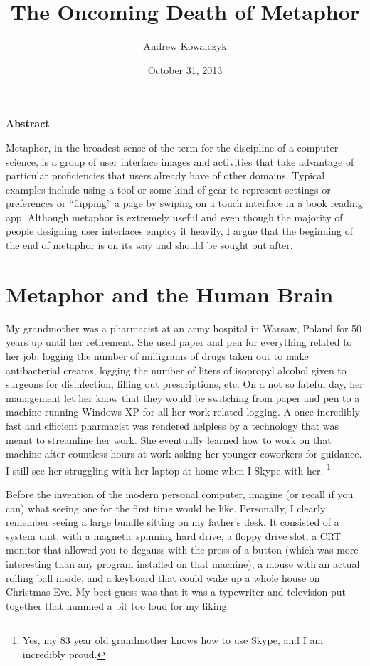 \documentclass[11pt, oneside]{article}
\title{The Oncoming Death of Metaphor}
\author{Andrew Kowalczyk}
\date{October 31, 2013}
\begin{document}
\maketitle
\centerline{\textbf{Abstract}}
Metaphor, in the broadest sense of the term for the discipline of a computer science, is a group of user interface images and activities that take advantage of particular proficiencies that users already have of other domains. Typical examples include using a tool or some kind of gear to represent settings or preferences or ``flipping'' a page by swiping on a touch interface in a book reading app. Although metaphor is extremely useful and even though the majority of people designing user interfaces employ it heavily, I argue that the beginning of the end of metaphor is on its way and should be sought out after.

\pagebreak
\section{Metaphor and the Human Brain} 
My grandmother was a pharmacist at an army hospital in Warsaw, Poland for 50 years up until her retirement. She used paper and pen for everything related to her job: logging the number of milligrams of drugs taken out to make antibacterial creams, logging the number of liters of isopropyl alcohol given to surgeons for disinfection, filling out prescriptions, etc. On a not so fateful day, her management let her know that they would be switching from paper and pen to a machine running Windows XP for all her work related logging. A once incredibly fast and efficient pharmacist was rendered helpless by a technology that was meant to streamline her work. She eventually learned how to work on that machine after countless hours at work asking her younger coworkers for guidance. I still see her struggling with her laptop at home when I Skype with her. \footnote{Yes, my 83 year old grandmother knows how to use Skype, and I am incredibly proud.}

Before the invention of the modern personal computer, imagine (or recall if you can) what seeing one for the first time would be like.
Personally, I clearly remember seeing a large bundle sitting on my father's desk. It consisted of a system unit, with a magnetic spinning hard drive, a floppy drive slot, a CRT monitor that allowed you to degauss with the press of a button (which was more interesting than any program installed on that machine), a mouse with an actual rolling ball inside, and a keyboard that could wake up a whole house on Christmas Eve. My best guess was that it was a typewriter and television put together that hummed a bit too loud for my liking.
\end{document}
